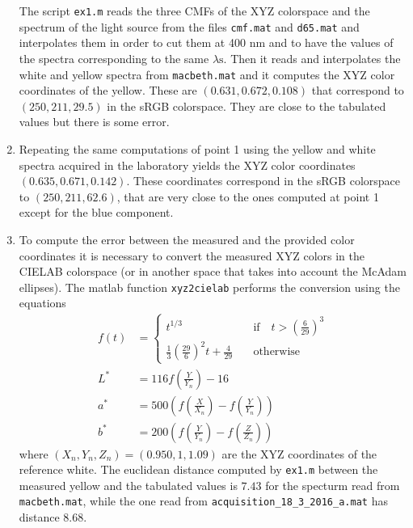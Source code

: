 \documentclass{article}
\newcommand{\includecode}[1]{}
\newcommand{\inlinecode}[1]{\lstinline[basicstyle=\ttfamily,keywordstyle={}]{#1}}
\begin{document}
\begin{enumerate}
  The script \inlinecode{ex1.m} reads the three CMFs of the XYZ
  colorspace and the spectrum of the light source from the files
  \inlinecode{cmf.mat} and \inlinecode{d65.mat} and interpolates them
  in order to cut them at 400 nm and to have the values of the spectra
  corresponding to the same $\lambda \text{s}$. Then it reads and
  interpolates the white and yellow spectra from
  \inlinecode{macbeth.mat} and it computes the XYZ color coordinates
  of the yellow. These are $(0.631, 0.672, 0.108)$ that correspond to
  $(250, 211, 29.5)$ in the sRGB colorspace. They are close to the
  tabulated values but there is some error.
\item Repeating the same computations of point 1 using the yellow and
  white spectra acquired in the laboratory yields the XYZ color
  coordinates $(0.635, 0.671, 0.142)$. These coordinates correspond in
  the sRGB colorspace to $(250, 211, 62.6)$, that are very close to
  the ones computed at point 1 except for the blue component.
\item To compute the error between the measured and the provided color
  coordinates it is necessary to convert the measured XYZ colors in
  the CIELAB colorspace (or in another space that takes into account
  the McAdam ellipses). The matlab function \inlinecode{xyz2cielab}
  performs the conversion using the equations
  \begin{align*}
    f(t) &= \begin{cases}
      t^{1/3} & \text{if} \quad t>\left(\frac{6}{29}\right)^3 \\
      \frac{1}{3}\left(\frac{29}{6}\right)^2t + \frac{4}{29} \quad & \text{otherwise}
    \end{cases} \\
    L^* &= 116f\left(\frac{Y}{Y_n}\right)-16 \\
    a^* &= 500\left(f\left(\frac{X}{X_n}\right) - f\left(\frac{Y}{Y_n}\right)\right) \\
    b^* &= 200\left(f\left(\frac{Y}{Y_n}\right) - f\left(\frac{Z}{Z_n}\right)\right)
  \end{align*}
  where $(X_n, Y_n, Z_n) = (0.950, 1, 1.09)$ are the XYZ coordinates
  of the reference white.  The euclidean distance computed by
  \inlinecode{ex1.m} between the measured yellow and the tabulated
  values is $7.43$ for the specturm read from
  \inlinecode{macbeth.mat}, while the one read from
  \inlinecode{acquisition_18_3_2016_a.mat} has distance $8.68$.
\end{enumerate}
\end{document}
